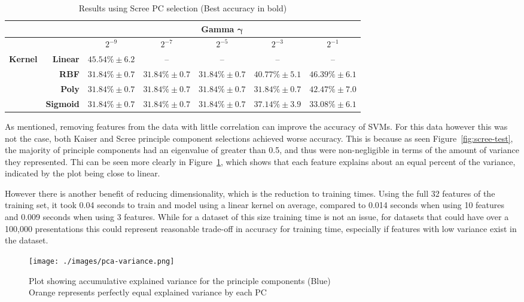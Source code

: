\documentclass[12pt,a4paper,titlepage,twoside]{report}
\begin{document}
	\begin{table}[h!]
		\centering
		\begin{tabular}{|ll|ccccc|}
			\hline
                                      &                                      &   			& \multicolumn{3}{c}{\textbf{Gamma $\boldsymbol{\gamma}$}} &   \\ \hline
                                      &                                      				& $2^{-9}$  		& $2^{-7}$       	& $2^{-5}$      	& $2^{-3}$			& $2^{-1}$ \\ \hline
			\multicolumn{1}{|l|}{\textbf{Kernel}} & \multicolumn{1}{r|}{\textbf{Linear}} 	& $45.54\% \pm6.2$ 	& --  				& --				& --	  			& --			   \\
			\multicolumn{1}{|l|}{\textbf{}}       & \multicolumn{1}{r|}{\textbf{RBF}}    	& $31.84\% \pm0.7$ 	& $31.84\% \pm0.7$  & $31.84\% \pm0.7$  & $40.77\% \pm5.1$  & \boldmath$46.39\% \pm6.1$ \\
			\multicolumn{1}{|l|}{\textbf{}}       & \multicolumn{1}{r|}{\textbf{Poly}}   	& $31.84\% \pm0.7$ 	& $31.84\% \pm0.7$  & $31.84\% \pm0.7$  & $31.84\% \pm0.7$  & $42.47\% \pm7.0$ \\
			\multicolumn{1}{|l|}{\textbf{}}       & \textbf{Sigmoid}                     	& $31.84\% \pm0.7$ 	& $31.84\% \pm0.7$  & $31.84\% \pm0.7$  & $37.14\% \pm3.9$  & $33.08\% \pm6.1$ \\ \hline
		\end{tabular}%
		\caption {Results using Scree PC selection (Best accuracy in bold)} 
		\label{tab:scree-pca-tab}
	\end{table} \par
	As mentioned, removing features from the data with little correlation can improve the accuracy of SVMs. For this data however this was not the case, both Kaiser and Scree principle component selections achieved worse accuracy. This is because as seen Figure~\ref{fig:scree-test}, the majority of principle components had an eigenvalue of greater than 0.5, and thus were non-negligible in terms of the amount of variance they represented. Thi can be seen more clearly in Figure~\ref{fig:pca-variance}, which shows that each feature explains about an equal percent of the variance, indicated by the plot being close to linear. \par
	However there is another benefit of reducing dimensionality, which is the reduction to training times. Using the full 32 features of the training set, it took 0.04 seconds to train and model using a linear kernel on average, compared to 0.014 seconds when using 10 features and 0.009 seconds when using 3 features. While for a dataset of this size training time is not an issue, for datasets that could have over a 100,000 presentations this could represent reasonable trade-off in accuracy for training time, especially if features with low variance exist in the dataset.
	\begin{figure}[h]
		\centering
		\texttt{[image: ./images/pca-variance.png]}
		\caption{Plot showing accumulative explained variance for the principle components (Blue) \\Orange represents perfectly equal explained variance by each PC}
		\label{fig:pca-variance}
	\end{figure}
	
\end{document}
